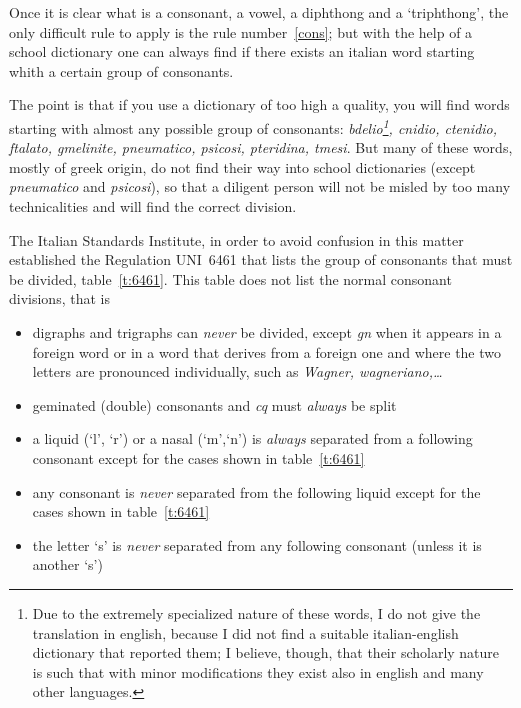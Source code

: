 Once  it  is  clear  what  is  a  consonant,  a  vowel,  a  diphthong  and a
`triphthong',  the  only  difficult  rule   to    apply    is    the    rule
number~\ref{cons};  but  with the help of a school dictionary one can always
find if there exists an italian word  starting  whith  a  certain  group  of
consonants.

The  point  is  that if you use a dictionary of too high a quality, you will
find words starting with almost  any  possible  group  of  consonants:  {\it
bdelio\footnote{Due to the extremely specialized nature of these words, I do
not give the translation in english, because  I  did  not  find  a  suitable
italian-english dictionary that reported them; I believe, though, that their
scholarly nature is such that with minor modifications they  exist  also  in
english  and  many  other languages.}, cnidio, ctenidio, ftalato, gmelinite,
pneumatico, psicosi, pteridina, tmesi}. But many of these words,  mostly  of
greek  origin,  do  not find their way into school dictionaries (except {\it
pneumatico} and {\it psicosi\/}), so that a  diligent  person  will  not  be
misled by too many technicalities and will find the correct division.

The  Italian Standards Institute, in order to avoid confusion in this matter
established the Regulation UNI~6461 \cite{6461}  that  lists  the  group  of
consonants  that  must  be  divided, table~\ref{t:6461}. This table does not
list the normal consonant divisions, that is
 \begin{itemize}

\item  digraphs  and  trigraphs  can {\it never} be divided, except {\it gn}
when it appears in a foreign word or in a word that derives from  a  foreign
one  and  where  the  two  letters are pronounced individually, such as {\it
Wagner, wagneriano,\dots}

\item geminated (double) consonants and {\it cq} must {\it always} be split

\item  a  liquid  (`l',  `r') or a nasal (`m',`n') is {\it always} separated
from a following consonant except for the cases shown in table~\ref{t:6461}

\item  any  consonant  is  {\it  never}  separated from the following liquid
except for the cases shown in table~\ref{t:6461}

\item  the  letter `s' is {\it never} separated from any following consonant
(unless it is another `s')

\end{itemize}

